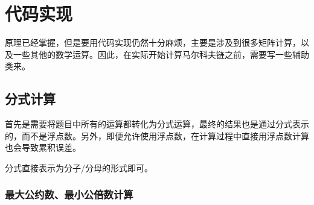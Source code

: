 \documentclass[12pt]{article}
\begin{document}
\section{代码实现}\label{ux4ee3ux7801ux5b9eux73b0}

原理已经掌握，但是要用代码实现仍然十分麻烦，主要是涉及到很多矩阵计算，以及一些其他的数学运算。因此，在实际开始计算马尔科夫链之前，需要写一些辅助类来。

\subsection{分式计算}\label{ux5206ux5f0fux8ba1ux7b97}

首先是需要将题目中所有的运算都转化为分式运算，最终的结果也是通过分式表示的，而不是浮点数。另外，即便允许使用浮点数，在计算过程中直接用浮点数计算也会导致累积误差。

\begin{Shaded}
\begin{Highlighting}[]
 \OperatorTok{\{}
      \OperatorTok{;}
      \OperatorTok{;}

     \OperatorTok{(}\OperatorTok{,} \OperatorTok{)} \OperatorTok{\{}
         \OperatorTok{(}\OperatorTok{==} \OperatorTok{)} \OperatorTok{\{}
              \OperatorTok{(}\OperatorTok{);}
        \OperatorTok{\}}
         \OperatorTok{=}\OperatorTok{;}
         \OperatorTok{=}\OperatorTok{;}
    \OperatorTok{\}}
\OperatorTok{\}}
\end{Highlighting}
\end{Shaded}

分式直接表示为分子/分母的形式即可。

\subsubsection{最大公约数、最小公倍数计算}\label{ux6700ux5927ux516cux7ea6ux6570ux6700ux5c0fux516cux500dux6570ux8ba1ux7b97}
\end{document}
